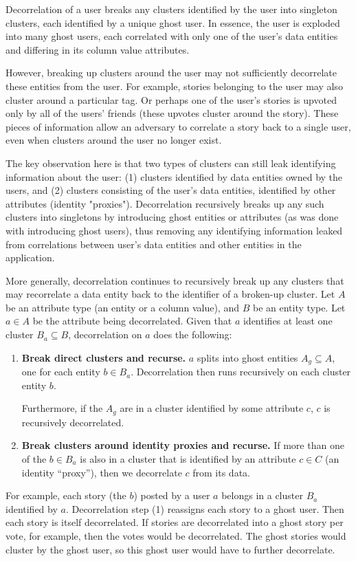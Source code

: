 Decorrelation of a user breaks any clusters identified by the user into singleton clusters, each
identified by a unique ghost user. In essence, the user is exploded into many ghost users, each
correlated with only one of the user's data entities and differing in its column
value attributes.

However, breaking up clusters around the user may not sufficiently decorrelate these entities from
the user. For example, stories belonging to the user may also cluster around a particular tag. Or
perhaps one of the user's stories is upvoted only by all of the users' friends (these upvotes
cluster around the story). These pieces of information allow an adversary to correlate a story back
to a single user, even when clusters around the user no longer exist.

The key observation here is that two types of clusters can still leak identifying information about
the user: (1) clusters identified by data entities owned by the users, and (2) clusters consisting
of the user's data entities, identified by other attributes (identity "proxies"). Decorrelation
recursively breaks up any such clusters into singletons by introducing ghost entities or attributes
(as was done with introducing ghost users), thus removing any identifying information leaked from
correlations between user's data entities and other entities in the application.

More generally, decorrelation continues to recursively break up any clusters that may recorrelate a
data entity back to the identifier of a broken-up cluster. Let $A$ be an attribute type (an entity
or a column value), and $B$ be an entity type. Let $a
\in A$ be the attribute being decorrelated. Given that $a$ identifies at least one cluster $B_a
\subseteq B$, decorrelation on $a$ does the following: 
\begin{enumerate} 
    \item \textbf{Break direct clusters and
            recurse.} $a$ splits into ghost entities $A_g \subseteq A$, one for each entity $b\in B_a$.
            Decorrelation then runs recursively on each cluster entity $b$.
            
            Furthermore, if the $A_g$ are in a cluster identified by some attribute $c$, $c$ is
            recursively decorrelated.
    \item \textbf{Break clusters around identity proxies and recurse.} If more than one of the
        $b \in B_a$ is also in a cluster that is identified by an attribute $c \in C$ (an identity
        ``proxy''), then we decorrelate $c$ from its data. 
        
\end{enumerate}
For example, each story (the $b$) posted by a user $a$ belongs in a cluster $B_a$ identified by $a$.
Decorrelation step (1) reassigns each story to a ghost user. Then each story is itself decorrelated.
If stories are decorrelated into a ghost story per vote, for example, then the votes would be
decorrelated. The ghost stories would cluster by the ghost user, so this ghost user would have to
further decorrelate.

